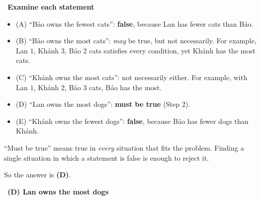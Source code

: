 \documentclass[11pt]{article}
\providecommand{\AnsWord}{Đáp số}
\newcommand{\ans}[1]{\par\smallskip{\bfseries\color{tmGreen!88!black}\AnsWord:}\ {\bfseries\color{AnsRed}#1}\par}
\newcommand{\step}[2]{\par\smallskip\noindent{\bfseries\color{tmBlue!85!black}\StepWord~#1.}\ {\bfseries #2}\par\nopagebreak}
\def\AnsWord{Answer}
\def\StepWord{Step}
\begin{document}
{\step{3}{Examine each statement}
\begin{itemize}[leftmargin=1.3em,itemsep=1pt]
\item (A) ``Bảo owns the fewest cats'': \textbf{false}, because Lan has fewer cats than Bảo.
\item (B) ``Bảo owns the most cats'': \emph{may} be true, but not necessarily. For example, Lan $1$, Khánh $3$, Bảo $2$ cats satisfies every condition, yet Khánh has the most cats.
\item (C) ``Khánh owns the most cats'': not necessarily either. For example, with Lan $1$, Khánh $2$, Bảo $3$ cats, Bảo has the most.
\item (D) ``Lan owns the most dogs'': \textbf{must be true} (Step 2).
\item (E) ``Khánh owns the fewest dogs'': \textbf{false}, because Bảo has fewer dogs than Khánh.
\end{itemize}
\begin{warnbox}``Must be true'' means true in \emph{every} situation that fits the problem. Finding a single situation in which a statement is false is enough to reject it.\end{warnbox}
So the answer is \textbf{(D)}.
\ans{(D) Lan owns the most dogs}
}
\end{document}
